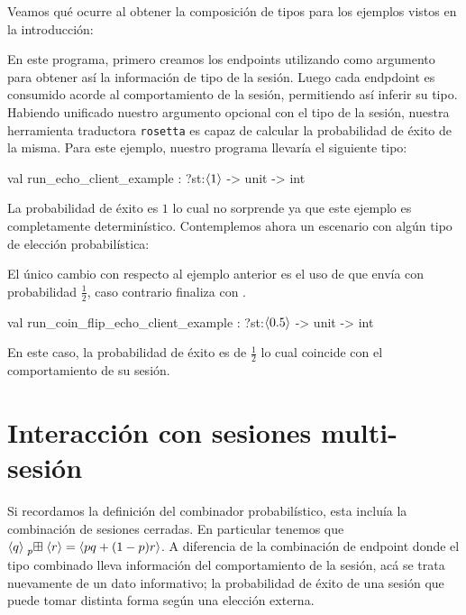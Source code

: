 Veamos qué ocurre al obtener la composición de tipos para los ejemplos vistos en la introducción:

\EchoClientClosedSession

En este programa, primero creamos los endpoints utilizando  como
argumento para obtener así la información de tipo de la sesión. Luego cada
endpdoint es consumido acorde al comportamiento de la sesión, permitiendo así
inferir su tipo. Habiendo unificado nuestro argumento opcional  con el
tipo de la sesión, nuestra herramienta traductora \texttt{rosetta} es capaz de
calcular la probabilidad de éxito de la misma. Para este ejemplo, nuestro programa
 llevaría el siguiente tipo:

\begin{table}[htb]
	\begin{OCamlD}
    val run_echo_client_example : ?st:$\ClosedSessionType[1]$ -> unit -> int
	\end{OCamlD}
\end{table}

La probabilidad de éxito es $1$ lo cual no sorprende ya que este ejemplo es
completamente determinístico. Contemplemos ahora un escenario con algún tipo de
elección probabilística:

\CoinFlipEchoClientClosedSession

El único cambio con respecto al ejemplo anterior es el uso de
 que envía con probabilidad $\frac{1}{2}$, caso
contrario finaliza con .

\begin{table}[htb]
	\begin{OCamlD}
 val run_coin_flip_echo_client_example : ?st:$\ClosedSessionType[0.5]$ -> unit -> int
	\end{OCamlD}
\end{table}

En este caso, la probabilidad de éxito es de $\frac{1}{2}$ lo cual coincide con
el comportamiento de su sesión.

\section{Interacción con sesiones multi-sesión}

Si recordamos la definición del combinador probabilístico, esta incluía la
combinación de sesiones cerradas. En particular tenemos que
$\csum{\ClosedSessionType[q]}{\ClosedSessionType[r]} =
\ClosedSessionType[pq+(1-p)r]$. A diferencia de la combinación de endpoint
donde el tipo combinado lleva información del comportamiento de la sesión, acá
se trata nuevamente de un dato informativo; la probabilidad de éxito de una
sesión que puede tomar distinta forma según una elección externa. 

